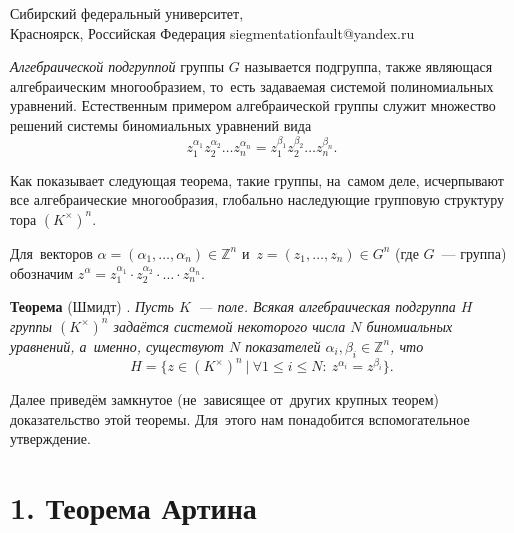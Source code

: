 \documentclass[twoside]{article}
\begin{document}
\maketitBegin %

\author{Николай А. Мишко}
{Сибирский федеральный университет,\\
Красноярск, Российская Федерация} {siegmentationfault@yandex.ru}


 \maketitEnd  %




\textit{Алгебраической подгруппой} группы $G$ называется подгруппа, также являющася
алгебраическим многообразием, то~есть задаваемая системой полиномиальных уравнений.
Естественным примером алгебраической группы служит множество решений системы биномиальных уравнений вида
$$
    z_1^{\alpha_1} z_2^{\alpha_2} \ldots z_n^{\alpha_n} = z_1^{\beta_1} z_2^{\beta_2} \ldots z_n^{\beta_n}.
$$

Как показывает следующая теорема, такие группы, на~самом деле, исчерпывают все алгебраические многообразия,
глобально наследующие групповую структуру тора $(K^\times)^n$.

Для~векторов $\alpha = (\alpha_1, \ldots, \alpha_n) \in \mathbb{Z}^n$ и~$z = (z_1, \ldots, z_n) \in G^n$ (где $G$~— группа)
обозначим $z^\alpha = z_1^{\alpha_1} \cdot z_2^{\alpha_2} \cdot \ldots \cdot z_n^{\alpha_n}$.

\medskip\noindent\textbf{Теорема} (Шмидт) \cite{Schm94}. \emph{
    Пусть $K$~— поле. Всякая алгебраическая подгруппа $H$ группы $(K^{\times})^n$ задаётся
    системой некоторого числа $N$ биномиальных уравнений, а~именно, существуют $N$ показателей $\alpha_i, \beta_i \in \mathbb{Z}^n$, что
    $$
        H = \{ z \in (K^{\times})^n\ |\ \forall 1 \leq i \leq N{:}\ z^{\alpha_i} = z^{\beta_i} \}.
    $$
}

Далее приведём замкнутое (не~зависящее от~других крупных теорем) доказательство этой теоремы.
Для~этого нам понадобится вспомогательное утверждение.

\section*{1. Теорема Артина}
\end{document}
